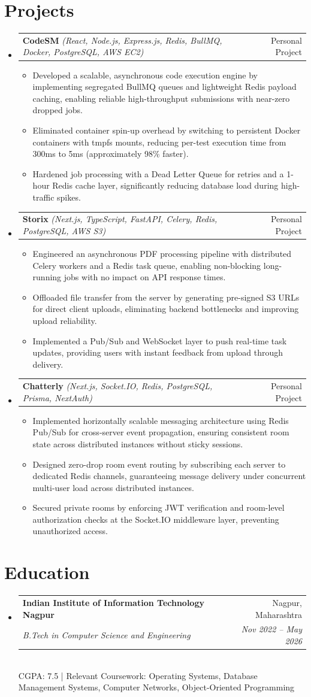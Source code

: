 \documentclass[letterpaper,10pt]{article}
\makeatletter
\newenvironment{resumeList}{
  \begin{itemize}[leftmargin=0.15in, label={}]
}{
  \end{itemize}
}
\newcommand{\resumeItem}[1]{
  \item\small{
    {#1 \vspace{-2.5pt}}
  }
}
\newcommand{\resumeSubheading}[4]{
  \vspace{-2pt}\item
    \begin{tabular*}{0.97\textwidth}[t]{l@{\extracolsep{\fill}}r}
      \textbf{#1} & #2 \\
      \textit{\small#3} & \textit{\small #4} \\
    \end{tabular*}\vspace{-6pt}
}
\newcommand{\resumeProjectHeading}[3]{
  \vspace{-2pt}\item
    \begin{tabular*}{0.97\textwidth}[t]{l@{\extracolsep{\fill}}r}
      \textbf{#1} \textit{\small(#2)} & #3 \\
    \end{tabular*}\vspace{-6pt}
}
\newcommand{\resumeItemListStart}{\begin{itemize}[leftmargin=0.15in]}
\newcommand{\resumeItemListEnd}{\end{itemize}\vspace{-5pt}}
\makeatother
\begin{document}
\section{Projects}
\begin{resumeList}
    \resumeProjectHeading
    {CodeSM}{React, Node.js, Express.js, Redis, BullMQ, Docker, PostgreSQL, AWS EC2}{Personal Project}
  \resumeItemListStart
    \resumeItem{Developed a scalable, asynchronous code execution engine by implementing segregated BullMQ queues and lightweight Redis payload caching, enabling reliable high-throughput submissions with near-zero dropped jobs.}
    \resumeItem{Eliminated container spin-up overhead by switching to persistent Docker containers with tmpfs mounts, reducing per-test execution time from 300ms to 5ms (approximately 98\% faster).}
    \resumeItem{Hardened job processing with a Dead Letter Queue for retries and a 1-hour Redis cache layer, significantly reducing database load during high-traffic spikes.}
  \resumeItemListEnd

  \resumeProjectHeading
    {Storix}{Next.js, TypeScript, FastAPI, Celery, Redis, PostgreSQL, AWS S3}{Personal Project}
  \resumeItemListStart
    \resumeItem{Engineered an asynchronous PDF processing pipeline with distributed Celery workers and a Redis task queue, enabling non-blocking long-running jobs with no impact on API response times.}
    \resumeItem{Offloaded file transfer from the server by generating pre-signed S3 URLs for direct client uploads, eliminating backend bottlenecks and improving upload reliability.}
    \resumeItem{Implemented a Pub/Sub and WebSocket layer to push real-time task updates, providing users with instant feedback from upload through delivery.}
  \resumeItemListEnd

  \resumeProjectHeading
    {Chatterly}{Next.js, Socket.IO, Redis, PostgreSQL, Prisma, NextAuth}{Personal Project}
  \resumeItemListStart
    \resumeItem{Implemented horizontally scalable messaging architecture using Redis Pub/Sub for cross-server event propagation, ensuring consistent room state across distributed instances without sticky sessions.}
    \resumeItem{Designed zero-drop room event routing by subscribing each server to dedicated Redis channels, guaranteeing message delivery under concurrent multi-user load across distributed instances.}
    \resumeItem{Secured private rooms by enforcing JWT verification and room-level authorization checks at the Socket.IO middleware layer, preventing unauthorized access.}
  \resumeItemListEnd
\end{resumeList}

\section{Education}
\begin{resumeList}
    \resumeSubheading
    {Indian Institute of Information Technology Nagpur}{Nagpur, Maharashtra}
    {B.Tech in Computer Science and Engineering}{Nov 2022 – May 2026}
    \vspace{2pt}\\
    \small{CGPA: 7.5 | Relevant Coursework: Operating Systems, Database Management Systems, Computer Networks, Object-Oriented Programming}
\end{resumeList}
\end{document}
